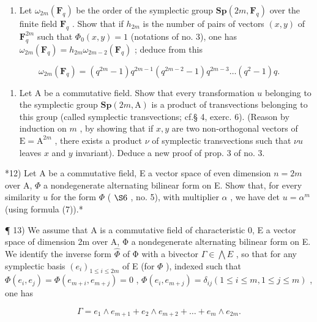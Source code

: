 \begin{enumerate}
\def\labelenumi{\arabic{enumi})}
\setcounter{enumi}{9}
\tightlist
\item
  Let \(\omega_{2m}(\mathbf{F}_q)\) be the order of the symplectic group \(\mathbf{Sp}(2m, \mathbf{F}_q)\) over the finite field \(\mathbf{F}_q\) . Show that if \(h_{2m}\) is the number of pairs of vectors \((x, y)\) of \(\mathbf{F}_q^{2m}\) such that \(\Phi_0(x, y) = 1\) (notations of no. 3), one has \(\omega_{2m}(\mathbf{F}_q) = h_{2m}\omega_{2m-2}(\mathbf{F}_q)\) ; deduce from this
\end{enumerate}

\[
\omega_ {2 m} (\mathbf {F} _ {q}) = (q ^ {2 m} - 1) q ^ {2 m - 1} (q ^ {2 m - 2} - 1) q ^ {2 m - 3} \dots (q ^ {2} - 1) q.
\]

\begin{enumerate}
\def\labelenumi{\arabic{enumi})}
\setcounter{enumi}{10}
\tightlist
\item
  Let A be a commutative field. Show that every transformation \(u\) belonging to the symplectic group \(\mathbf{Sp}(2m, \mathrm{A})\) is a product of transvections belonging to this group (called symplectic transvections; cf.§ 4, exerc. 6). (Reason by induction on \(m\) , by showing that if \(x, y\) are two non-orthogonal vectors of \(\mathrm{E} = \mathrm{A}^{2m}\) , there exists a product \(\nu\) of symplectic transvections such that \(\nu u\) leaves \(x\) and \(y\) invariant). Deduce a new proof of prop. 3 of no. 3.
\end{enumerate}

*12) Let A be a commutative field, E a vector space of even dimension \(n=2m\) over A, \(\Phi\) a nondegenerate alternating bilinear form on E. Show that, for every similarity \(u\) for the form \(\Phi\) ( \(\S 6\) , no. 5), with multiplier \(\alpha\) , we have det \(u=\alpha^{m}\) (using formula (7)).*

¶ 13) We assume that A is a commutative field of characteristic 0, E a vector space of dimension 2m over A, Φ a nondegenerate alternating bilinear form on E. We identify the inverse form \(\widehat{\Phi}\) of Φ with a bivector \(\Gamma\in\bigwedge E\) , so that for any symplectic basis \((e_{i})_{1\leqslant i\leqslant2m}\) of E (for \(\Phi\) ), indexed such that \(\Phi(e_{i},e_{j})=\Phi(e_{m+i},e_{m+j})=0\) , \(\Phi(e_{i},e_{m+j})=\delta_{ij}(1\leqslant i\leqslant m,1\leqslant j\leqslant m)\) , one has

\[
\Gamma = e _ {1} \wedge e _ {m + 1} + e _ {2} \wedge e _ {m + 2} + \dots + e _ {m} \wedge e _ {2 m}.
\]

